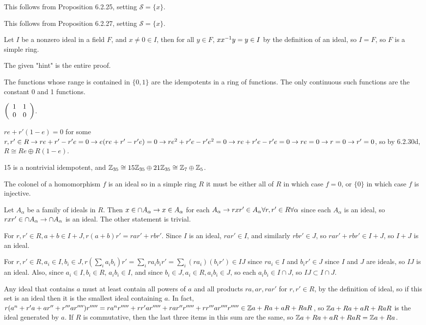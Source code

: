 \documentclass[11pt, oneside]{article}   	%
\begin{document}
\item This follows from Proposition 6.2.25, setting $\mathcal{S} = \{x\}$.
\item This follows from Proposition 6.2.27, setting $\mathcal{S} = \{x\}$.
\item Let $I$ be a nonzero ideal in a field $F$, and $x \not=0 \in I$, then for all $y \in F$, $xx^{-1} y = y \in I$ by the definition of an ideal, so $I=F$, so $F$ is a simple ring.
\item The given "hint" is the entire proof.
\item The functions whose range is contained in $\{0, 1\}$ are the idempotents in a ring of functions. The only continuous such functions are the constant 0 and 1 functions.
\item $\left( \begin{array}{ccc} 1 & 1 \\ 0 & 0 \end{array} \right)$.
\item $re + r'(1-e) = 0$ for some $r, r' \in R \rightarrow re + r' - r'e = 0 \rightarrow e(re + r' - r'e) = 0 \rightarrow re^2 + r'e - r'e^2 = 0 \rightarrow re + r'e - r'e = 0 \rightarrow re = 0 \rightarrow r = 0 \rightarrow r'=0$, so by 6.2.30d, $R \cong Re \oplus R(1-e)$. 
\item 15 is a nontrivial idempotent, and $\mathbb{Z}_{35} \cong 15 \mathbb{Z}_{35} \oplus 21 \mathbb{Z}_{35} \cong \mathbb{Z}_7 \oplus \mathbb{Z}_5$.
\item The colonel of a homomorphism $f$ is an ideal so in a simple ring $R$ it must be either all of $R$ in which case $f=0$, or $\{0\}$ in which case $f$ is injective.
\item Let $A_\alpha$ be a family of ideals in $R$. Then $x \in \cap A_\alpha \rightarrow x \in A_\alpha$ for each $A_\alpha \rightarrow rxr' \in A_\alpha \forall r, r' \in R \forall \alpha$ since each $A_\alpha$ is an ideal, so $rxr' \in \cap A_\alpha \rightarrow \cap A_\alpha$ is an ideal. The other statement is trivial.
\item For $r, r' \in R, a + b \in I + J, r(a + b)r' = rar' + rbr'$. Since $I$ is an ideal, $rar'\in I$, and similarly $rbr' \in J$, so $rar' + rbr' \in I + J$, so $I + J$ is an ideal.
\item For $r, r' \in R, a_i \in I, b_i \in J, r(\sum_i a_ib_i)r' = \sum_ira_ib_ir' = \sum_i(ra_i)(b_ir') \in IJ$ since $ra_i \in I$ and $b_ir' \in J$ since $I$ and $J$ are ideals, so $IJ$ is an ideal. Also, since $a_i \in I, b_i \in R$, $a_ib_i \in I$, and since $b_i \in J, a_i \in R, a_ib_i \in J$, so each $a_ib_i \in I \cap J$, so $IJ \subset I \cap J$.
\item Any ideal that contains $a$ must at least contain all powers of $a$ and all products $ra, ar, rar'$ for $r, r' \in R$, by the definition of ideal, so if this set is an ideal then it is the smallest ideal containing $a$. In fact, $r(a^n + r'a + ar'' + r'''ar'''')r''''' = ra^nr''''' + rr'ar''''' + rar''r''''' + rr'''ar''''r''''' \in \mathbb{Z} a + Ra + aR + RaR$, so $\mathbb{Z} a + Ra + aR + RaR$ is the ideal generated by $a$. If $R$ is commutative, then the last three items in this sum are the same, so $\mathbb{Z} a + Ra + aR + RaR = \mathbb{Z} a + Ra$.
\end{document}
